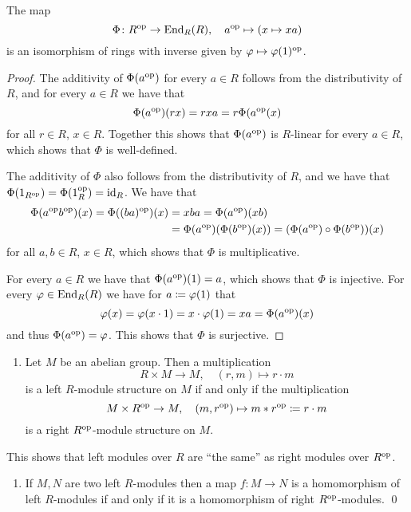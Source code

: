 \begin{lemma}
  \label{lemma: End_R(R) = Rop}
  The map
  \[
              \Phi
    \colon    R^{\operatorname{op}}
    \to       \operatorname{End}_R(R),
    \quad     a^{\operatorname{op}}
    \mapsto   (x \mapsto xa)
  \]
  is an isomorphism of rings with inverse given by $\varphi \mapsto \varphi(1)^{\operatorname{op}}$.
\end{lemma}


\begin{proof}
  The additivity of $\Phi(a^{\operatorname{op}})$ for every $a \in R$ follows from the distributivity of $R$, and for every $a \in R$ we have that
  \[
      \Phi(a^{\operatorname{op}})(rx)
    = r x a
    = r \Phi(a^{\operatorname{op}}(x)
  \]
  for all $r \in R$, $x \in R$.
  Together this shows that $\Phi(a^{\operatorname{op}})$ is $R$-linear for every $a \in R$, which shows that $\Phi$ is well-defined.
  
  The additivity of $\Phi$ also follows from the distributivity of $R$, and we have that $\Phi(1_{R^{\operatorname{op}}}) = \Phi(1_R^{\operatorname{op}}) = \operatorname{id}_R$.
  We have that
  \begin{align*}
        \Phi(a^{\operatorname{op}} b^{\operatorname{op}})(x)
     =  \Phi((ba)^{\operatorname{op}})(x)
    &=  x b a
     =  \Phi(a^{\operatorname{op}})(x b)  \\
    &=  \Phi(a^{\operatorname{op}})(\Phi(b^{\operatorname{op}})(x))
     =  (\Phi(a^{\operatorname{op}}) \circ \Phi(b^{\operatorname{op}}))(x)
  \end{align*}
  for all $a, b \in R$, $x \in R$, which shows that $\Phi$ is multiplicative.
  
  For every $a \in R$ we have that $\Phi(a^{\operatorname{op}})(1) = a$, which shows that $\Phi$ is injective.
  For every $\varphi \in \operatorname{End}_R(R)$ we have for $a \coloneqq \varphi(1)$ that
  \[
      \varphi(x)
    = \varphi(x \cdot 1)
    = x \cdot \varphi(1)
    = x a
    = \Phi(a^{\operatorname{op}})(x)
  \]
  and thus $\Phi(a^{\operatorname{op}}) = \varphi$.
  This shows that $\Phi$ is surjective.
\end{proof}


\begin{proposition}
  \label{proposition: left right modules under op}
  \leavevmode
  \begin{enumerate}
    \item
      Let $M$ be an abelian group.
      Then a multiplication
      \[
                R \times M 
        \to     M,
        \quad   (r,m)
        \mapsto r \cdot m
      \]
      is a left $R$-module structure on $M$ if and only if the multiplication
      \[
                  M \times R^{\operatorname{op}}
        \to       M,
        \quad     (m, r^{\operatorname{op}})
        \mapsto   m * r^{\operatorname{op}}
        \coloneqq  r \cdot m
      \]
      is a right $R^{\operatorname{op}}$-module structure on $M$.
  \end{enumerate}
  This shows that left modules over $R$ are \enquote{the same} as right modules over $R^{\operatorname{op}}$.
  \begin{enumerate}[resume]
    \item
      If $M, N$ are two left $R$-modules then a map $f \colon M \to N$ is a homomorphism of left $R$-modules if and only if it is a homomorphism of right $R^{\operatorname{op}}$-modules.
    \qed
  \end{enumerate}
\end{proposition}


